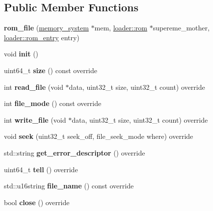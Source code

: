 \subsection*{Public Member Functions}
\begin{DoxyCompactItemize}
\item 
\mbox{\label{structeka2l1_1_1rom__file_a4f06d6484d3c445ca10c350e7befede4}} 
{\bfseries rom\+\_\+file} (\mbox{\hyperlink{classeka2l1_1_1memory__system}{memory\+\_\+system}} $\ast$mem, \mbox{\hyperlink{structeka2l1_1_1loader_1_1rom}{loader\+::rom}} $\ast$supereme\+\_\+mother, \mbox{\hyperlink{structeka2l1_1_1loader_1_1rom__entry}{loader\+::rom\+\_\+entry}} entry)
\item 
\mbox{\label{structeka2l1_1_1rom__file_a4c8c65b4b6e5436557b16991ba56521e}} 
void {\bfseries init} ()
\item 
\mbox{\label{structeka2l1_1_1rom__file_a8e7bbf3e56afb3c834a546141c56d24a}} 
uint64\+\_\+t {\bfseries size} () const override
\item 
\mbox{\label{structeka2l1_1_1rom__file_a8690b379bb6696f88bfbf565c624d7dc}} 
int {\bfseries read\+\_\+file} (void $\ast$data, uint32\+\_\+t size, uint32\+\_\+t count) override
\item 
\mbox{\label{structeka2l1_1_1rom__file_a65fe99c4d49197b5b3f2ae682b470143}} 
int {\bfseries file\+\_\+mode} () const override
\item 
\mbox{\label{structeka2l1_1_1rom__file_ab6262cedc47df527c8bd08a9a3cfe8d4}} 
int {\bfseries write\+\_\+file} (void $\ast$data, uint32\+\_\+t size, uint32\+\_\+t count) override
\item 
\mbox{\label{structeka2l1_1_1rom__file_a5cd7431043a6bea516fd2286693f0d73}} 
void {\bfseries seek} (uint32\+\_\+t seek\+\_\+off, file\+\_\+seek\+\_\+mode where) override
\item 
\mbox{\label{structeka2l1_1_1rom__file_a342f4f5cf40ecffb723399727c1df611}} 
std\+::string {\bfseries get\+\_\+error\+\_\+descriptor} () override
\item 
\mbox{\label{structeka2l1_1_1rom__file_a86732283aef1d5a4af116213c77b3a92}} 
uint64\+\_\+t {\bfseries tell} () override
\item 
\mbox{\label{structeka2l1_1_1rom__file_a17cd48ccbc1c63264741aa0fd0539ac3}} 
std\+::u16string {\bfseries file\+\_\+name} () const override
\item 
\mbox{\label{structeka2l1_1_1rom__file_ad46487a354f8379e80ec443570637e88}} 
bool {\bfseries close} () override
\end{DoxyCompactItemize}
